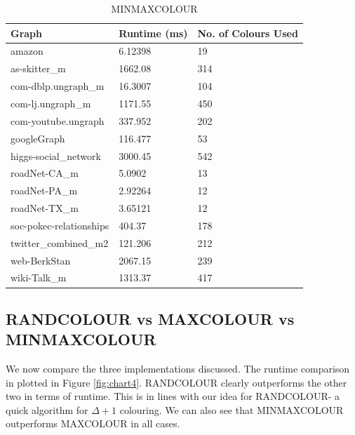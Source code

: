 \documentclass[MTech]{iitmdiss}
\begin{document}
\begin{table}[]
\centering
\begin{tabular}{|l|l|l|}
\hline
Graph                   & Runtime (ms) & No. of Colours Used \\ \hline
amazon                  & 6.12398      & 19                  \\ \hline
as-skitter\_m           & 1662.08      & 314                 \\ \hline
com-dblp.ungraph\_m     & 16.3007      & 104                 \\ \hline
com-lj.ungraph\_m       & 1171.55      & 450                 \\ \hline
com-youtube.ungraph     & 337.952      & 202                 \\ \hline
googleGraph             & 116.477      & 53                  \\ \hline
higgs-social\_network   & 3000.45      & 542                 \\ \hline
roadNet-CA\_m           & 5.0902       & 13                  \\ \hline
roadNet-PA\_m           & 2.92264      & 12                  \\ \hline
roadNet-TX\_m           & 3.65121      & 12                  \\ \hline
soc-pokec-relationships & 404.37       & 178                 \\ \hline
twitter\_combined\_m2   & 121.206      & 212                 \\ \hline
web-BerkStan            & 2067.15      & 239                 \\ \hline
wiki-Talk\_m            & 1313.37      & 417                 \\ \hline
\end{tabular}
\caption{MINMAXCOLOUR}
\label{minTable}
\end{table}

\subsection{RANDCOLOUR vs MAXCOLOUR vs MINMAXCOLOUR}
We now compare the three implementations discussed. The runtime comparison in plotted in Figure \ref{fig:chart4}. RANDCOLOUR clearly outperforms the other two in terms of runtime. This is in lines with our idea for RANDCOLOUR- a quick algorithm for $\Delta+1$ colouring. We can also see that MINMAXCOLOUR outperforms MAXCOLOUR in all cases. 
\end{document}
